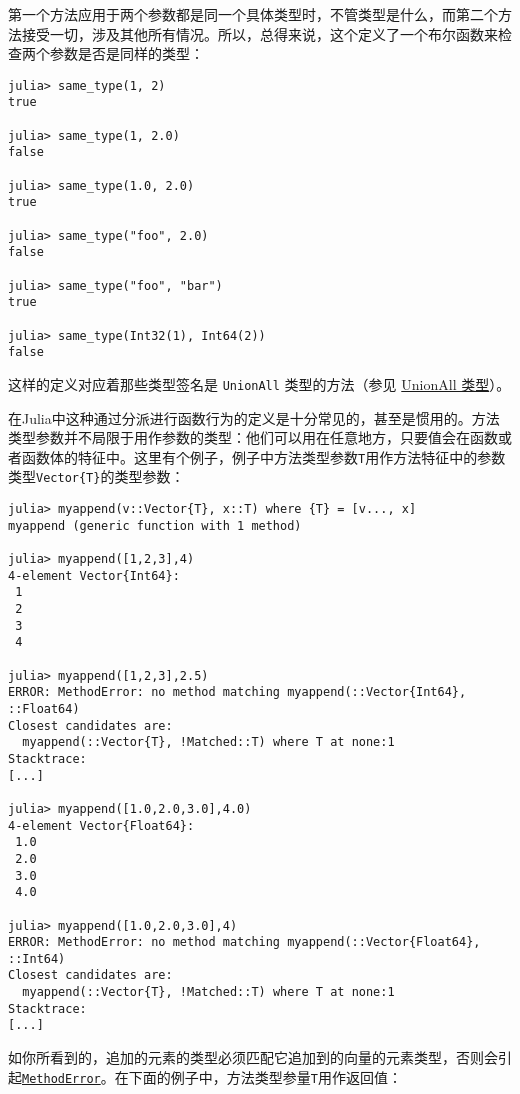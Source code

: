 第一个方法应用于两个参数都是同一个具体类型时，不管类型是什么，而第二个方法接受一切，涉及其他所有情况。所以，总得来说，这个定义了一个布尔函数来检查两个参数是否是同样的类型：




\begin{verbatim}
julia> same_type(1, 2)
true

julia> same_type(1, 2.0)
false

julia> same_type(1.0, 2.0)
true

julia> same_type("foo", 2.0)
false

julia> same_type("foo", "bar")
true

julia> same_type(Int32(1), Int64(2))
false
\end{verbatim}



这样的定义对应着那些类型签名是 \texttt{UnionAll} 类型的方法（参见 \hyperlink{11072845175692859046}{UnionAll 类型}）。



在Julia中这种通过分派进行函数行为的定义是十分常见的，甚至是惯用的。方法类型参数并不局限于用作参数的类型：他们可以用在任意地方，只要值会在函数或者函数体的特征中。这里有个例子，例子中方法类型参数\texttt{T}用作方法特征中的参数类型\texttt{Vector\{T\}}的类型参数：




\begin{verbatim}
julia> myappend(v::Vector{T}, x::T) where {T} = [v..., x]
myappend (generic function with 1 method)

julia> myappend([1,2,3],4)
4-element Vector{Int64}:
 1
 2
 3
 4

julia> myappend([1,2,3],2.5)
ERROR: MethodError: no method matching myappend(::Vector{Int64}, ::Float64)
Closest candidates are:
  myappend(::Vector{T}, !Matched::T) where T at none:1
Stacktrace:
[...]

julia> myappend([1.0,2.0,3.0],4.0)
4-element Vector{Float64}:
 1.0
 2.0
 3.0
 4.0

julia> myappend([1.0,2.0,3.0],4)
ERROR: MethodError: no method matching myappend(::Vector{Float64}, ::Int64)
Closest candidates are:
  myappend(::Vector{T}, !Matched::T) where T at none:1
Stacktrace:
[...]
\end{verbatim}



如你所看到的，追加的元素的类型必须匹配它追加到的向量的元素类型，否则会引起\hyperlink{68769522931907606}{\texttt{MethodError}}。在下面的例子中，方法类型参量\texttt{T}用作返回值：




